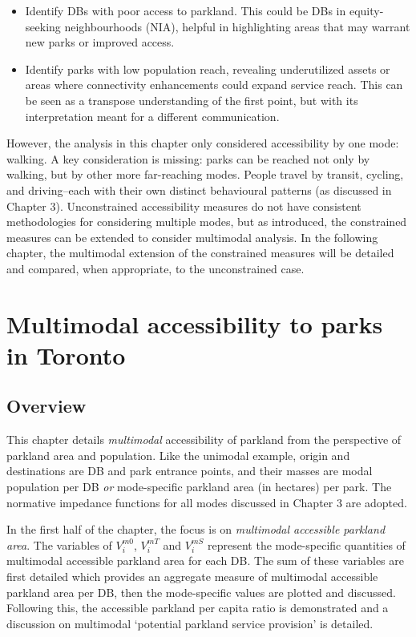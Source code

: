 \documentclass[
11pt, %
oneside, %
english, %
singlespacing, %
]{macthesis} %
\def\tightlist{}
\begin{document}
\begin{itemize}
\tightlist
\item
  Identify DBs with poor access to parkland. This could be DBs in equity-seeking neighbourhoods (NIA), helpful in highlighting areas that may warrant new parks or improved access.
\item
  Identify parks with low population reach, revealing underutilized assets or areas where connectivity enhancements could expand service reach. This can be seen as a transpose understanding of the first point, but with its interpretation meant for a different communication.
\end{itemize}

However, the analysis in this chapter only considered accessibility by one mode: walking. A key consideration is missing: parks can be reached not only by walking, but by other more far-reaching modes. People travel by transit, cycling, and driving--each with their own distinct behavioural patterns (as discussed in Chapter 3). Unconstrained accessibility measures do not have consistent methodologies for considering multiple modes, but as introduced, the constrained measures can be extended to consider multimodal analysis. In the following chapter, the multimodal extension of the constrained measures will be detailed and compared, when appropriate, to the unconstrained case.

\chapter{Multimodal accessibility to parks in Toronto}\label{multimodal-accessibility-to-parks-in-toronto}

\section{Overview}\label{overview-4}

This chapter details \emph{multimodal} accessibility of parkland from the perspective of parkland area and population. Like the unimodal example, origin and destinations are DB and park entrance points, and their masses are modal population per DB \emph{or} mode-specific parkland area (in hectares) per park. The normative impedance functions for all modes discussed in Chapter 3 are adopted.

In the first half of the chapter, the focus is on \emph{multimodal accessible parkland area}. The variables of \(V^{m0}_i\), \(V^{mT}_i\) and \(V^{mS}_i\) represent the mode-specific quantities of multimodal accessible parkland area for each DB. The sum of these variables are first detailed which provides an aggregate measure of multimodal accessible parkland area per DB, then the mode-specific values are plotted and discussed. Following this, the accessible parkland per capita ratio is demonstrated and a discussion on multimodal `potential parkland service provision' is detailed.
\end{document}
